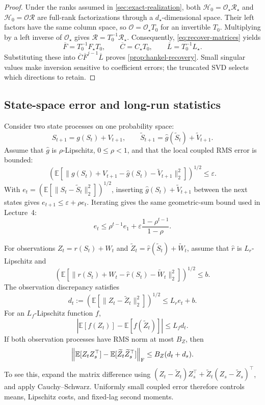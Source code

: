\documentclass[11pt,twoside]{article}
\newcommand{\E}{\mathbb E}
\theoremstyle{definition}
\theoremstyle{remark}
\begin{document}
\hankelrecovery*
\begin{proof}
Under the ranks assumed in \cref{sec:exact-realization}, both
\(\mathcal H_0=\mathcal O_\star\mathcal R_\star\) and
\(\mathcal H_0=\mathcal O\mathcal R\) are full-rank factorizations
through a \(d_\star\)-dimensional space.
Their left factors have the same column space, so
\(\mathcal O=\mathcal O_\star T_0\) for an invertible \(T_0\).
Multiplying by a left inverse of \(\mathcal O_\star\) gives
\(\mathcal R=T_0^{-1}\mathcal R_\star\).
Consequently, \cref{eq:recover-matrices} yields
\[
 \overline F=T_0^{-1}F_\star T_0,\qquad
 \overline C=C_\star T_0,\qquad
 \overline L=T_0^{-1}L_\star.
\]
Substituting these into
\(\overline C\overline F^{j-1}\overline L\)
proves \cref{prop:hankel-recovery}.
Small singular values make inversion sensitive to coefficient errors;
the truncated SVD selects which directions to retain.
\end{proof}

\subsection{State-space error and long-run statistics}
\label{app:state-stability}

Consider two state processes on one probability space:
\[
 S_{t+1}=g(S_t)+V_{t+1},\qquad
 \widetilde S_{t+1}=\widehat g(\widetilde S_t)+\widetilde V_{t+1}.
\]
Assume that \(\widehat g\) is \(\rho\)-Lipschitz, \(0\le\rho<1\),
and that the local coupled RMS error is bounded:
\[
 \left(\E\left[
 \lVert g(S_t)+V_{t+1}
 -\widehat g(S_t)-\widetilde V_{t+1}\rVert_2^2
 \right]\right)^{1/2}\le\varepsilon.
\]
With \(e_t=(\E[\lVert S_t-\widetilde S_t\rVert_2^2])^{1/2}\),
inserting \(\widehat g(S_t)+\widetilde V_{t+1}\) between the next
states gives \(e_{t+1}\le\varepsilon+\rho e_t\).
Iterating gives the same geometric-sum bound used in Lecture~4:
\[
 e_t\le\rho^{t-1}e_1+
 \varepsilon\frac{1-\rho^{t-1}}{1-\rho}.
\]

For observations \(Z_t=r(S_t)+W_t\) and
\(\widetilde Z_t=\widehat r(\widetilde S_t)+\widetilde W_t\),
assume that \(\widehat r\) is \(L_r\)-Lipschitz and
\[
 \left(\E\left[
 \lVert r(S_t)+W_t-\widehat r(S_t)-\widetilde W_t\rVert_2^2
 \right]\right)^{1/2}\le b.
\]
The observation discrepancy satisfies
\[
 d_t:=(\E[\lVert Z_t-\widetilde Z_t\rVert_2^2])^{1/2}
 \le L_re_t+b.
\]
For an \(L_f\)-Lipschitz function \(f\),
\[
 |\E[f(Z_t)]-\E[f(\widetilde Z_t)]|\le L_fd_t.
\]
If both observation processes have RMS norm at most \(B_Z\), then
\begin{equation}
 \left\lVert\E[Z_tZ_s^\top]
 -\E[\widetilde Z_t\widetilde Z_s^\top]\right\rVert_{\rm F}
 \le B_Z(d_t+d_s).
 \label{eq:second-moment-control}
\end{equation}
To see this, expand the matrix difference using
\((Z_t-\widetilde Z_t)Z_s^\top+
\widetilde Z_t(Z_s-\widetilde Z_s)^\top\), and apply Cauchy--Schwarz.
Uniformly small coupled error therefore controls means, Lipschitz
costs, and fixed-lag second moments.
\end{document}
